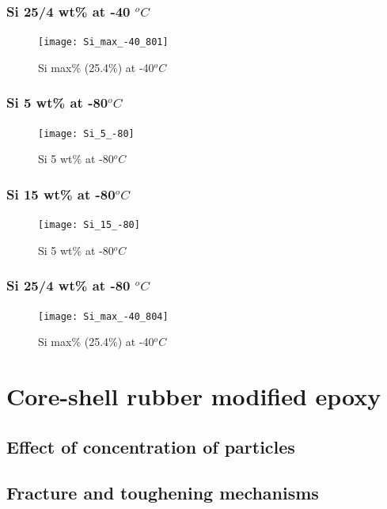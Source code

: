 \documentclass[numbers=noendperiod,chapterprefix=on]{icldt} %
\begin{document}
{\subsubsection{Si 25/4 wt\% at -40 $^oC$}


\begin{figure}[!hp]
\centering
\texttt{[image: Si\_max\_-40\_801]}
\caption{Si max\% (25.4\%) at -40$^oC$} \label{Si_max_-40_801}
\end{figure}
\FloatBarrier

\subsubsection{Si 5 wt\% at -80$^oC$}

\begin{figure}[!hp]
\centering
\texttt{[image: Si\_5\_-80]}
\caption{Si 5 wt\% at -80$^oC$} \label{Si_5_-80}
\end{figure}
\FloatBarrier

\subsubsection{Si 15 wt\% at -80$^oC$}

\begin{figure}[!hp]
\centering
\texttt{[image: Si\_15\_-80]}
\caption{Si 5 wt\% at -80$^oC$} \label{Si_15_-80}
\end{figure}
\FloatBarrier


\subsubsection{Si 25/4 wt\% at -80 $^oC$}
\begin{figure}[!hp]
\centering
\texttt{[image: Si\_max\_-40\_804]}
\caption{Si max\% (25.4\%) at -40$^oC$} \label{Si_max_-40_804}
\end{figure}
\FloatBarrier


\section{Core-shell rubber modified epoxy}

\subsection{Effect of concentration of particles}


\subsection{Fracture and toughening mechanisms}
}
\end{document}

